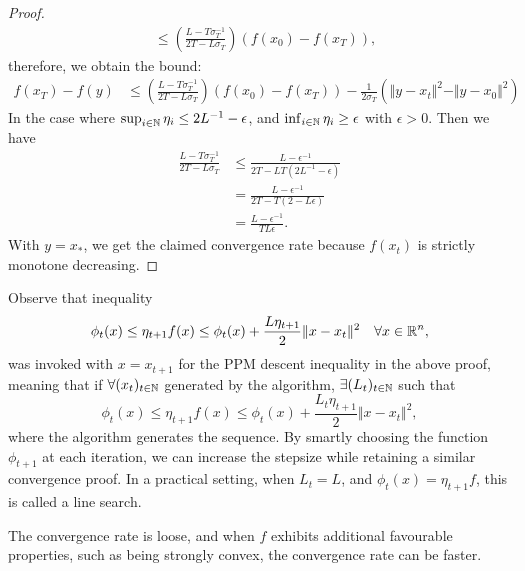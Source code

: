 \documentclass[12pt]{article}
\begin{document}
\begin{proof}
\begin{align*}
                &\le 
                \left(
                    \frac{L- T\sigma_T^{-1}}{2T - L\sigma_T}
                \right)
                (f(x_0) - f(x_T)), 
            \end{align*}
            therefore, we obtain the bound: 
            \begin{align*}
                f(x_T) - f(y) &\le 
                \left(
                    \frac{L- T\sigma_T^{-1}}{2T - L\sigma_T}
                \right)
                (f(x_0) - f(x_T))
                - 
                \frac{1}{2\sigma_T}(\Vert y - x_t\Vert^2 - \Vert y - x_0\Vert^2)
            \end{align*}
            In the case where $\sup_{i\in \mathbb N} \eta_i \le 2L^{-1} - \epsilon$, and $\inf_{i\in \mathbb N}\eta_i \ge \epsilon$ with $\epsilon > 0$. 
            Then we have 
            \begin{align*}
                \frac{L -T\sigma_T^{-1}}{2T - L\sigma_T}
                &\le 
                \frac{L - \epsilon^{-1}}{2T - LT(2L^{-1} - \epsilon)}
                \\
                &= 
                \frac{L - \epsilon^{-1}}{2T - T(2 - L\epsilon)}
                \\
                &= 
                \frac{L - \epsilon^{-1}}{TL\epsilon}. 
            \end{align*}
            With $y = x_*$, we get the claimed convergence rate because $f(x_t)$ is strictly monotone decreasing. 
        \end{proof}
        \begin{remark}
            Observe that inequality 
            $$
                \phi_t(x) \le \eta_{t + 1}f(x) \le \phi_t(x) 
                + 
                \frac{L\eta_{t + 1}}{2}\Vert x - x_t\Vert^2 \quad \forall x \in \mathbb R^n, 
            $$
            was invoked with $x = x_{t + 1}$ for the PPM descent inequality in the above proof, meaning that if  $\forall (x_t)_{t \in \mathbb N}$ generated by the algorithm, $\exists (L_t)_{t \in \mathbb N}$ such that
            $$
                \phi_t(x) \le \eta_{t + 1}f(x) \le \phi_t(x) 
                + 
                \frac{L_t\eta_{t + 1}}{2}\Vert x - x_t\Vert^2,
            $$
            where the algorithm generates the sequence. 
            By smartly choosing the function $\phi_{t + 1}$ at each iteration, we can increase the stepsize while retaining a similar convergence proof. 
            In a practical setting, when $L_t = L$, and $\phi_{t}(x) = \eta_{t + 1}f$, this is called a line search.
            \par
            The convergence rate is loose, and when $f$ exhibits additional favourable properties, such as being strongly convex, the convergence rate can be faster. 
        \end{remark}
\end{document}
